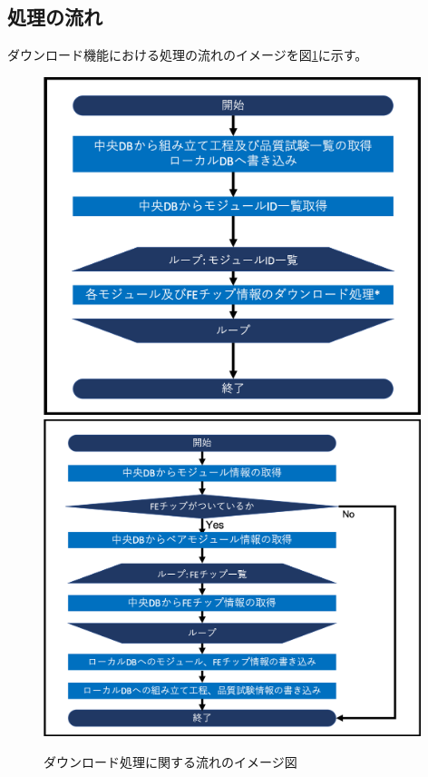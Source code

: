 \subsection{処理の流れ}

ダウンロード機能における処理の流れのイメージを図\ref{download_algorithm}に示す。

\begin{figure}[bpt]\centering
  \begin{center}
  \includegraphics[width=11cm]{download_tool_flow_whole.png}
  \includegraphics[width=11cm]{download_tool_flow_detail.png}
  \caption[ダウンロード処理に関する流れのイメージ図]{ダウンロード処理に関する流れのイメージ図}
  \label{download_algorithm}
  \end{center}
\end{figure}

